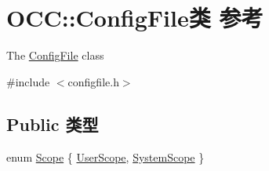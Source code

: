 \hypertarget{class_o_c_c_1_1_config_file}{}\section{O\+CC\+:\+:Config\+File类 参考}
\label{class_o_c_c_1_1_config_file}


The \hyperlink{class_o_c_c_1_1_config_file}{Config\+File} class  




{\ttfamily \#include $<$configfile.\+h$>$}

\subsection*{Public 类型}
\begin{DoxyCompactItemize}
\item 
enum \hyperlink{class_o_c_c_1_1_config_file_ab571084ce59ba92b0ce4079460b7c869}{Scope} \{ \hyperlink{class_o_c_c_1_1_config_file_ab571084ce59ba92b0ce4079460b7c869a850e942974c8d22118753d5664eb49e9}{User\+Scope}, 
\hyperlink{class_o_c_c_1_1_config_file_ab571084ce59ba92b0ce4079460b7c869a12de32b0994f72b53e55960986774918}{System\+Scope}
 \}
\end{DoxyCompactItemize}
